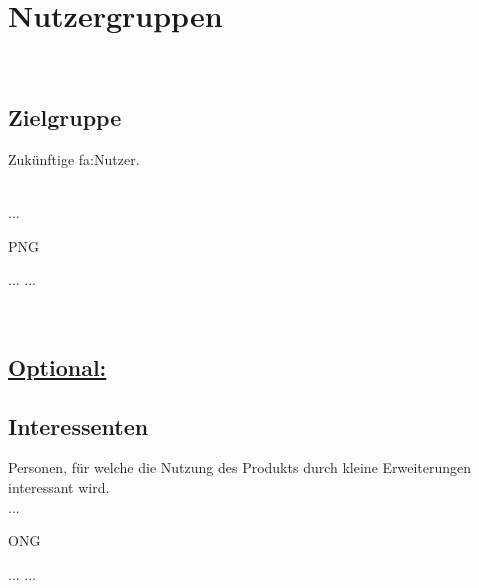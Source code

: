 %
%


\chapter{Nutzergruppen}
\label{NG}~\\


\section{Zielgruppe}
\label{NG:ZG}

Zukünftige \gls{fa:Nutzer}.

~\\
...

\begin{ids}{\gls{PNG}}

	\id[ 1] ...
	\id[10] ...

\end{ids}

~\\


\section*{\underline{Optional:}}

\section{Interessenten}
\label{NG:Interessenten}

Personen, für welche die Nutzung des Produkts durch kleine Erweiterungen interessant wird.\\

...
\\

\begin{ids}{\gls{ONG}}

	\id[ 11] ...
	\id[100] ...

\end{ids}
